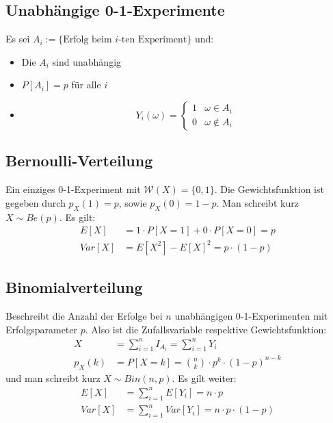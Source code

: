 \documentclass[8pt]{extarticle}
\newcommand{\W}{\mathcal{W}}
\newcommand{\Sn}{\sum_{i = 1}^n}
\begin{document}
\begin{multicols*}{3}
  \subsection*{Unabhängige 0-1-Experimente}
  Es sei $A_i := \{\text{Erfolg beim $i$-ten Experiment}\}$ und:
  \begin{itemize}
    \item Die $A_i$ sind unabhängig
    \item $P[A_i] = p$ für alle $i$
    \item $$
            Y_i (\omega) =
            \begin{cases}
              1 & \omega \in A_i      \\
              0 & \omega \not \in A_i
            \end{cases}
          $$
  \end{itemize}
  \subsection*{Bernoulli-Verteilung}
  Ein einziges 0-1-Experiment mit $\W (X) = \{0, 1\}$. Die Gewichtsfunktion ist
  gegeben durch $p_X (1) = p$, sowie $p_X (0) = 1-p$. Man schreibt kurz $X \sim
    Be (p)$. Es gilt:
  \begin{align*}
    E[X]   & = 1 \cdot P[X = 1] + 0 \cdot P[X = 0] = p \\
    Var[X] & = E[X^2] - E[X]^2 = p \cdot  (1-p)
  \end{align*}
  \subsection*{Binomialverteilung}
  Beschreibt die Anzahl der Erfolge bei $n$ unabhängigen 0-1-Experimenten mit
  Erfolgsparameter $p$. Also ist die Zufallsvariable respektive Gewichtsfunktion:
  \begin{align*}
    X      & = \Sn I_{A_i} = \Sn Y_i                               \\
    p_X (k) & = P[X = k] = \binom{n}{k} \cdot p^k \cdot  (1-p)^{n-k}
  \end{align*}
  und man schreibt kurz $X \sim Bin (n, p)$. Es gilt weiter:
  \begin{align*}
    E[X]   & = \Sn E[Y_i] = n \cdot p               \\
    Var[X] & = \Sn Var[Y_i] = n \cdot p \cdot  (1-p)
  \end{align*}

\end{multicols*}
\end{document}
